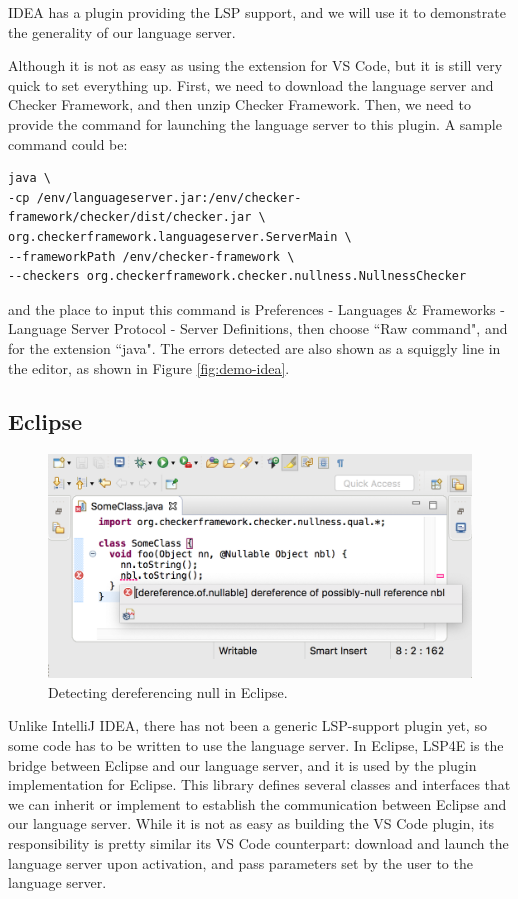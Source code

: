 \documentclass{article}
\begin{document}
IDEA has a plugin providing the LSP support\cite{idealsp}, and we will use it to demonstrate the generality of our language server.

Although it is not as easy as using the extension for VS Code, but it is still very quick to set everything up. First, we need to download the language server and Checker Framework, and then unzip Checker Framework. Then, we need to provide the command for launching the language server to this plugin. A sample command could be:

\begin{lstlisting}
java \
-cp /env/languageserver.jar:/env/checker-framework/checker/dist/checker.jar \
org.checkerframework.languageserver.ServerMain \
--frameworkPath /env/checker-framework \
--checkers org.checkerframework.checker.nullness.NullnessChecker
\end{lstlisting}

and the place to input this command is Preferences - Languages \& Frameworks - Language Server Protocol - Server Definitions, then choose ``Raw command", and for the extension ``java". The errors detected are also shown as a squiggly line in the editor, as shown in Figure \ref{fig:demo-idea}.


\subsection{Eclipse}

\begin{figure}[ht]
\centering
\includegraphics[scale=0.6]{demo-eclipse.png}
\caption{Detecting dereferencing null in Eclipse.}
\label{fig:demo-eclipse}
\end{figure}

Unlike IntelliJ IDEA, there has not been a generic LSP-support plugin yet, so some code has to be written to use the language server.  In Eclipse, LSP4E is the bridge between Eclipse and our language server, and it is used by the plugin implementation for Eclipse.  This library defines several classes and interfaces that we can inherit or implement to establish the communication between Eclipse and our language server.  While it is not as easy as building the VS Code plugin, its responsibility is pretty similar its VS Code counterpart: download and launch the language server upon activation, and pass parameters set by the user to the language server.
\end{document}
